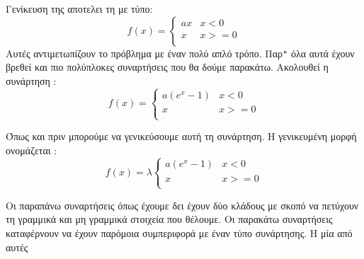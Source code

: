 Γενίκευση της αποτελει τη  με τύπο:
\[f(x)=\left\{\begin{array}{ll}ax & x<0 \\ x & x>=0 \\ \end{array} \right.\]
Αυτές αντιμετωπίζουν το πρόβλημα με έναν πολύ απλό τρόπο. Παρ\texttt{"} όλα αυτά έχουν βρεθεί και πιο πολύπλοκες συναρτήσεις που θα δούμε παρακάτω. Ακολουθεί η συνάρτηση :
\[f(x)=\left\{\begin{array}{ll}a(e^x-1) & x<0 \\ x & x>=0 \\ \end{array} \right.\]
\begin{figure}[H]
    \centering
    \caption{}
\end{figure}
Όπως και πριν μπορούμε να γενικεύσουμε αυτή τη συνάρτηση. Η γενικευμένη μορφή ονομάζεται :
\[f(x)=\lambda\left\{\begin{array}{ll}a(e^x-1) & x<0 \\ x & x>=0 \\ \end{array} \right.\]
\begin{figure}[H]
    \centering
    \caption{}
\end{figure}
Οι παραπάνω συναρτήσεις όπως έχουμε δει έχουν δύο κλάδους με σκοπό να πετύχουν τη γραμμικά και μη γραμμικά στοιχεία που θέλουμε. Οι παρακάτω συναρτήσεις καταφέρνουν να έχουν παρόμοια συμπεριφορά με έναν τύπο συνάρτησης. Η μία από αυτές
